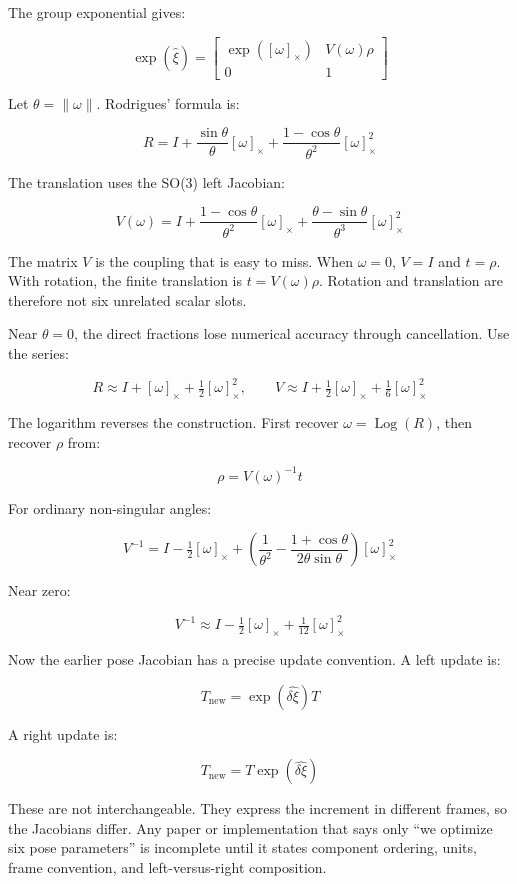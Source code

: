 The group exponential gives:

\[
\exp(\widehat{\xi})=\begin{bmatrix}\exp([\omega]_\times)&V(\omega)\rho\\0&1\end{bmatrix}
\]

Let \(\theta=\lVert\omega\rVert\). Rodrigues' formula is:

\[
R=I+\frac{\sin\theta}{\theta}[\omega]_\times+
\frac{1-\cos\theta}{\theta^2}[\omega]_\times^2
\]

The translation uses the SO(3) left Jacobian:

\[
V(\omega)=I+\frac{1-\cos\theta}{\theta^2}[\omega]_\times+
\frac{\theta-\sin\theta}{\theta^3}[\omega]_\times^2
\]

The matrix \(V\) is the coupling that is easy to miss. When \(\omega=0\), \(V=I\) and \(t=\rho\). With rotation, the finite translation is \(t=V(\omega)\rho\). Rotation and translation are therefore not six unrelated scalar slots.

Near \(\theta=0\), the direct fractions lose numerical accuracy through cancellation. Use the series:

\[
R\approx I+[\omega]_\times+\tfrac12[\omega]_\times^2,
\qquad
V\approx I+\tfrac12[\omega]_\times+\tfrac16[\omega]_\times^2
\]

The logarithm reverses the construction. First recover \(\omega=\operatorname{Log}(R)\), then recover \(\rho\) from:

\[
\rho=V(\omega)^{-1}t
\]

For ordinary non-singular angles:

\[
V^{-1}=I-\tfrac12[\omega]_\times+
\left(\frac1{\theta^2}-\frac{1+\cos\theta}{2\theta\sin\theta}\right)
[\omega]_\times^2
\]

Near zero:

\[
V^{-1}\approx I-\tfrac12[\omega]_\times+\tfrac1{12}[\omega]_\times^2
\]

Now the earlier pose Jacobian has a precise update convention. A left update is:

\[T_{\text{new}}=\exp(\widehat{\delta\xi})T\]

A right update is:

\[T_{\text{new}}=T\exp(\widehat{\delta\xi})\]

These are not interchangeable. They express the increment in different frames, so the Jacobians differ. Any paper or implementation that says only ``we optimize six pose parameters'' is incomplete until it states component ordering, units, frame convention, and left-versus-right composition.

